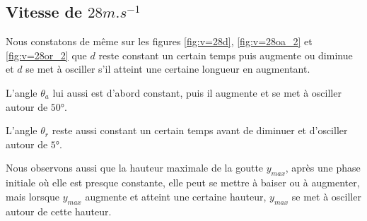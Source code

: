 \subsection{Vitesse de $28m.s^{-1}$}
Nous constatons de même sur les figures \ref{fig:v=28d}, \ref{fig:v=28oa_2} et \ref{fig:v=28or_2} que $d$ reste constant un certain temps puis augmente ou diminue et $d$ se met à osciller s'il atteint une certaine longueur en augmentant.

L'angle $\theta_{a}$ lui aussi est d'abord constant, puis il augmente et se met à osciller autour de $\ang{50}$.

L'angle $\theta_{r}$ reste aussi constant un certain temps avant de diminuer et d'osciller autour de $\ang{5}$.

Nous observons aussi que la hauteur maximale de la goutte $y_{max}$, après une phase initiale où elle est presque constante, elle peut se mettre à baiser ou à augmenter, mais lorsque $y_{max}$ augmente et atteint une certaine hauteur, $y_{max}$ se met à osciller autour de cette hauteur.

